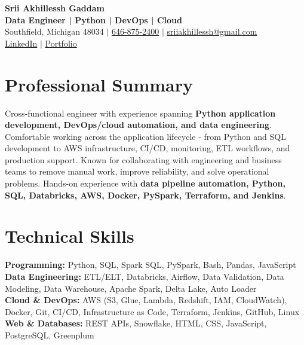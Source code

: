 \documentclass[letterpaper,10pt]{article}
\begin{document}
\fontsize{9.35pt}{10.45pt}\selectfont

\begin{center}
    {\LARGE \textbf{Srii Akhillessh Gaddam}} \\[-1pt]
    \textbf{Data Engineer | Python | DevOps | Cloud} \\[2pt]
    Southfield, Michigan 48034 $|$
    \href{tel:6468752400}{646-875-2400} $|$
    \href{mailto:sriiakhillessh@gmail.com}{sriiakhillessh@gmail.com} \\[1pt]
    \href{https://www.linkedin.com/in/srii-akhiilessh-gaddam-b48668191/}{LinkedIn} $|$
    \href{https://sriiakhillesshg.github.io/portfolio/}{Portfolio}
\end{center}
\vspace{-8pt}

\section{Professional Summary}
\small{Cross-functional engineer with experience spanning \textbf{Python application development, DevOps/cloud automation, and data engineering}. Comfortable working across the application lifecycle - from Python and SQL development to AWS infrastructure, CI/CD, monitoring, ETL workflows, and production support. Known for collaborating with engineering and business teams to remove manual work, improve reliability, and solve operational problems. Hands-on experience with \textbf{data pipeline automation, Python, SQL, Databricks, AWS, Docker, PySpark, Terraform, and Jenkins}.}

\section{Technical Skills}
\small{
\textbf{Programming:} Python, SQL, Spark SQL, PySpark, Bash, Pandas, JavaScript \\
\textbf{Data Engineering:} ETL/ELT, Databricks, Airflow, Data Validation, Data Modeling, Data Warehouse, Apache Spark, Delta Lake, Auto Loader \\
\textbf{Cloud \& DevOps:} AWS (S3, Glue, Lambda, Redshift, IAM, CloudWatch), Docker, Git, CI/CD, Infrastructure as Code, Terraform, Jenkins, GitHub, Linux \\
\textbf{Web \& Databases:} REST APIs, Snowflake, HTML, CSS, JavaScript, PostgreSQL, Greenplum
}
\end{document}
